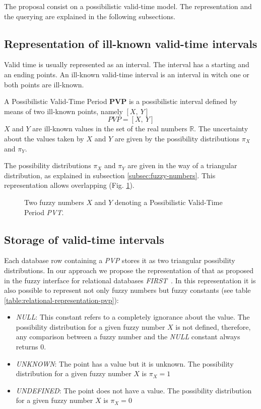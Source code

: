 The proposal consist on a possibilistic valid-time model. The representation and the querying are explained in the following subsections.

\subsection{Representation of ill-known valid-time intervals}
Valid time is usually represented as an interval. The interval has a starting and an ending points. An ill-known valid-time interval is an interval in witch one or both points are ill-known. 

\begin{definition}
A Possibilistic Valid-Time Period \textbf{PVP} is a possibilistic interval defined by means of two ill-known points, namely $\left[ X,\ Y \right]$
\begin{equation}
PVP = \left[X,\ Y \right] 
\end{equation}
$X$ and $Y$ are ill-known values in the set of the real numbers $\mathbb{R}$. The uncertainty about the values taken by $X$ and $Y$ are given by the possibility distributions $\pi_X$ and $\pi_Y$.
\end{definition}

The possibility distributions $\pi_X$ and $\pi_Y$ are given in the way of a triangular distribution, as explained in subsection \ref{subsec:fuzzy-numbers}. This representation allows overlapping (Fig. \ref{fig:pvp}).


\begin{figure}[h!]
  \centering
  \caption{Two fuzzy numbers $X$ and $Y$ denoting a Possibilistic Valid-Time Period \emph{PVT}.}
  \label{fig:pvp}
\end{figure}

\subsection{Storage of valid-time intervals}
Each database row containing a \emph{PVP} stores it as two triangular possibility distributions. In our approach we propose the representation of that as proposed in the  fuzzy interface for relational databases \emph{FIRST}~\cite{Medina94gefred.a,Gal98,Gal06}. In this representation it is also possible to represent not only fuzzy numbers but fuzzy constants (see table \ref{table:relational-representation-pvp}):

\begin{itemize}
\item
\emph{NULL}: This constant refers to a completely ignorance about the value. The possibility distribution for a given fuzzy number $X$ is not defined, therefore, any comparison between a fuzzy number and the \emph{NULL} constant always returns $0$.
\item
\emph{UNKNOWN}: The point has a value but it is unknown. The possibility distribution for a given fuzzy number $X$ is $\pi_X=1$
\item
\emph{UNDEFINED}: The point does not have a value. The possibility distribution for a given fuzzy number $X$ is $\pi_X=0$
\end{itemize}


